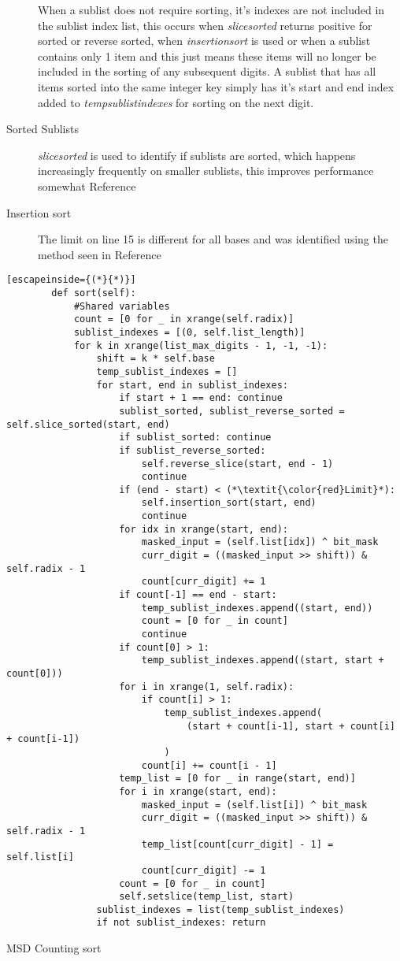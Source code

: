 \documentclass[12pt]{article}
\begin{document}
\begin{description}
	\par When a sublist does not require sorting, it's indexes are not included in the sublist index list, this occurs when \textit{slice\textunderscore sorted} returns positive for sorted or reverse sorted, when \textit{insertion\textunderscore sort} is used or when a sublist contains only 1 item and this just means these items will no longer be included in the sorting of any subsequent digits. A sublist that has all items sorted into the same integer key simply has it's start and end index added to \textit{temp\textunderscore sublist\textunderscore indexes} for sorting on the next digit.

	\item[Sorted Sublists] \textit{slice\textunderscore sorted} is used to identify if sublists are sorted, which happens increasingly frequently on smaller sublists, this improves performance somewhat {\color{red}Reference}
	\item[Insertion sort] The limit on line 15 is different for all bases and was identified using the method seen in {\color{red} Reference}
\end{description}
\begin{table}[H]
	\lstset{
		language=python,
    numbers=left,
    stepnumber=1,
    showstringspaces=false,
    tabsize=3,
    breaklines=true,
    breakatwhitespace=false,}
	\centering
	\begin{lstlisting}[escapeinside={(*}{*)}]
        def sort(self):
			#Shared variables
			count = [0 for _ in xrange(self.radix)]
			sublist_indexes = [(0, self.list_length)]
			for k in xrange(list_max_digits - 1, -1, -1):
				shift = k * self.base
				temp_sublist_indexes = []
				for start, end in sublist_indexes:
					if start + 1 == end: continue
					sublist_sorted, sublist_reverse_sorted = self.slice_sorted(start, end)
					if sublist_sorted: continue
					if sublist_reverse_sorted:
						self.reverse_slice(start, end - 1)
						continue
					if (end - start) < (*\textit{\color{red}Limit}*):
						self.insertion_sort(start, end)
						continue
					for idx in xrange(start, end):
						masked_input = (self.list[idx]) ^ bit_mask
						curr_digit = ((masked_input >> shift)) & self.radix - 1
						count[curr_digit] += 1
					if count[-1] == end - start:
						temp_sublist_indexes.append((start, end))
						count = [0 for _ in count]
						continue
					if count[0] > 1:
						temp_sublist_indexes.append((start, start + count[0]))
					for i in xrange(1, self.radix):
						if count[i] > 1:
							temp_sublist_indexes.append(
								(start + count[i-1], start + count[i] + count[i-1])
							)
						count[i] += count[i - 1]
					temp_list = [0 for _ in range(start, end)]
					for i in xrange(start, end):
						masked_input = (self.list[i]) ^ bit_mask
						curr_digit = ((masked_input >> shift)) & self.radix - 1
						temp_list[count[curr_digit] - 1] = self.list[i]
						count[curr_digit] -= 1
					count = [0 for _ in count]
					self.setslice(temp_list, start)
				sublist_indexes = list(temp_sublist_indexes)
				if not sublist_indexes: return
\end{lstlisting}
\caption*{MSD Counting sort}
\end{table}
\end{document}

